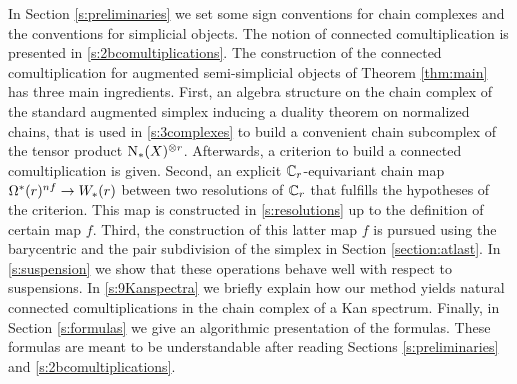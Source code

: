 In Section \ref{s:preliminaries} we set some sign conventions for chain complexes and the conventions for simplicial objects.
The notion of connected comultiplication is presented in \cref{s:2bcomultiplications}.
The construction of the connected comultiplication for augmented semi-simplicial objects of Theorem \ref{thm:main} has three main ingredients.
First, an algebra structure on the chain complex of the standard augmented simplex inducing a duality theorem on normalized chains, that is used in \cref{s:3complexes} to build a convenient chain subcomplex of the tensor product $\operatorname{N}_{*}(X)^{ \otimes  r}$.
Afterwards, a criterion to build a connected comultiplication is given.
Second, an explicit $\mathbb{C}_r$-equivariant chain map $\Omega^*(r)^{nf}\to W_*(r)$ between two resolutions of $\mathbb{C}_r$ that fulfills the hypotheses of the criterion.
This map is constructed in \cref{s:resolutions} up to the definition of certain map $f$.
Third, the construction of this latter map $f$ is pursued using the barycentric and the pair subdivision of the simplex in Section \ref{section:atlast}.
In \cref{s:suspension} we show that these operations behave well with respect to suspensions.
In \cref{s:9Kanspectra} we briefly explain how our method yields natural connected comultiplications in the chain complex of a Kan spectrum.
Finally, in Section \ref{s:formulas} we give an algorithmic presentation of the formulas.
These formulas are meant to be understandable after reading Sections \ref{s:preliminaries} and \ref{s:2bcomultiplications}.